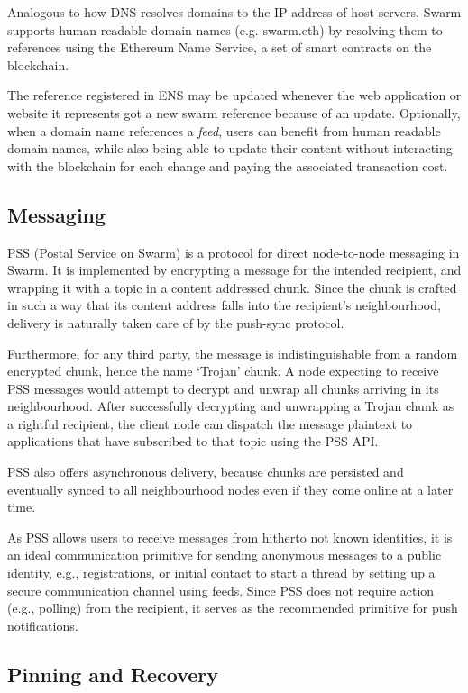 \documentclass[12pt,a4paper]{article}
\begin{document}
Analogous to how DNS resolves domains to the IP address of host servers, Swarm supports human-readable domain names (e.g. swarm.eth) by resolving them to references using the Ethereum Name Service, a set of smart contracts on the blockchain. 

The reference registered in ENS may be updated whenever the web application or website it represents got a new swarm reference because of an update. Optionally, when  a domain name references a \emph{feed}, users can benefit from human readable domain names, while also being able to update their content without interacting with the blockchain for each change and paying the associated transaction cost.

\subsection{Messaging}

PSS (Postal Service on Swarm) is a protocol for direct node-to-node messaging in Swarm. It is implemented by encrypting a message for the intended recipient, and wrapping it with a topic in a content addressed chunk. Since the chunk is crafted in such a way that its content address falls into the recipient’s neighbourhood, delivery is naturally taken care of by the push-sync protocol. 

Furthermore, for any third party, the message is indistinguishable from a random encrypted chunk, hence the name ‘Trojan’ chunk. A node expecting to receive PSS messages would attempt to decrypt and unwrap all chunks arriving in its neighbourhood. After successfully decrypting and unwrapping a Trojan chunk as a rightful recipient, the client node can dispatch the message plaintext to applications that have subscribed to that topic using the PSS API.

PSS also offers asynchronous delivery, because chunks are persisted and eventually synced to all neighbourhood nodes even if they come online at a later time. 

As PSS allows users to receive messages from hitherto not known identities, it is an ideal communication primitive for sending anonymous messages to a public identity, e.g., registrations, or initial contact to start a thread by setting up a secure communication channel using feeds. Since PSS does not require action (e.g., polling) from the recipient, it serves as the recommended primitive for push notifications. 

\subsection{Pinning and Recovery}
\end{document}
